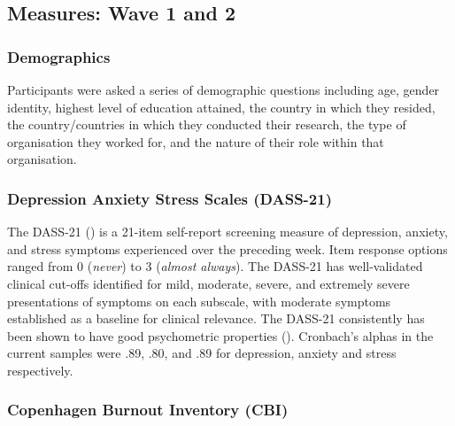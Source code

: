 \documentclass[
  man,
  longtable,
  nolmodern,
  notxfonts,
  notimes,
  colorlinks=true,linkcolor=blue,citecolor=blue,urlcolor=blue]{apa7}
\begin{document}
\subsection{Measures: Wave 1 and 2}\label{measures-wave-1-and-2}

\subsubsection{Demographics}\label{demographics}

Participants were asked a series of demographic questions including age,
gender identity, highest level of education attained, the country in
which they resided, the country/countries in which they conducted their
research, the type of organisation they worked for, and the nature of
their role within that organisation.

\subsubsection{Depression Anxiety Stress Scales
(DASS-21)}\label{depression-anxiety-stress-scales-dass-21}

The DASS-21 () is a 21-item self-report screening measure of
depression, anxiety, and stress symptoms experienced over the preceding
week. Item response options ranged from 0 (\emph{never}) to 3
(\emph{almost always}). The DASS-21 has well-validated clinical cut-offs
identified for mild, moderate, severe, and extremely severe
presentations of symptoms on each subscale, with moderate symptoms
established as a baseline for clinical relevance. The DASS-21
consistently has been shown to have good psychometric properties
(). Cronbach's alphas in the current samples were .89, .80, and .89
for depression, anxiety and stress respectively.

\subsubsection{Copenhagen Burnout Inventory
(CBI)}\label{copenhagen-burnout-inventory-cbi}
\end{document}
